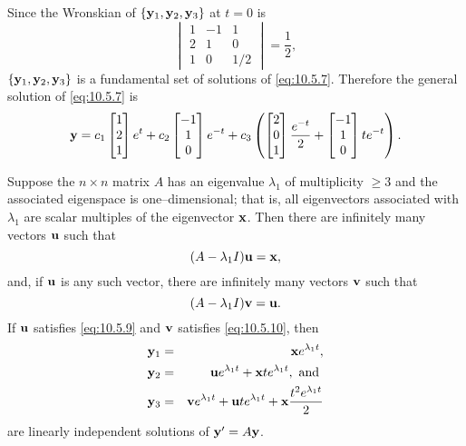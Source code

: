 \documentclass{ximera}
\begin{document}
\begin{example}
\begin{explanation}
Since the Wronskian of $\{{\bf y}_1,{\bf y}_2,{\bf y}_3\}$
at $t=0$ is
$$
\begin{vmatrix}
1&-1&1\\2&1&0\\1&0&1/2\end{vmatrix}=\frac{1}{2},
$$
$\{{\bf y}_1,{\bf y}_2,{\bf y}_3\}$ is a fundamental set of solutions
of \eqref{eq:10.5.7}. Therefore the general solution of \eqref{eq:10.5.7}
is
$$
{\bf y}=c_1\begin{bmatrix}1\\2\\1\end{bmatrix}e^t+c_2\begin{bmatrix}-1\\1\\0\end{bmatrix}e^{-t}+c_3\left
(\begin{bmatrix}2\\0\\1\end{bmatrix}\frac{e^{-t}}{2}+\begin{bmatrix}-1\\1\\0\end{bmatrix}te^{-t}\right).
$$
\end{explanation}
\end{example}


\begin{theorem}\label{thmtype:10.5.2}
Suppose the $n\times n$ matrix $A$ has an eigenvalue $\lambda_1$ of
multiplicity $\geq 3$ and the associated eigenspace is
one--dimensional; that is, all eigenvectors associated with
$\lambda_1$
are scalar multiples of the eigenvector ${\bf x}$. Then there are
infinitely many vectors ${\bf u}$ such that
\begin{equation}\label{eq:10.5.9}
(A-\lambda_1I){\bf u}={\bf x},
\end{equation}
and, if ${\bf u}$ is any such vector,  there are infinitely many
vectors ${\bf v}$ such that
\begin{equation}\label{eq:10.5.10}
(A-\lambda_1I){\bf v}={\bf u}.
\end{equation}
 If ${\bf u}$ satisfies \eqref{eq:10.5.9}  and ${\bf v}$ satisfies
\eqref{eq:10.5.10},  then
\begin{eqnarray*}
{\bf y}_1 &=&{\bf x} e^{\lambda_1t},\\
{\bf y}_2&=&{\bf u}e^{\lambda_1t}+{\bf x} te^{\lambda_1t},\mbox{
and }\\
{\bf y}_3&=&{\bf v}e^{\lambda_1t}+{\bf u}te^{\lambda_1t}+{\bf
x} \frac{t^2e^{\lambda_1t}}{2}
\end{eqnarray*}
are linearly independent solutions of  ${\bf y}'=A{\bf y}$.
\end{theorem}
\end{document}
